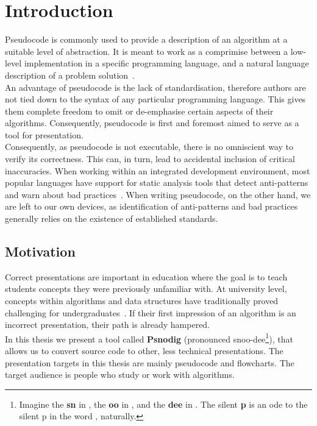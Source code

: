 \chapter{Introduction}

Pseudocode is commonly used to provide a description of an algorithm at a suitable level of abstraction. It is meant to work as a comprimise between a low-level implementation in a specific programming language, and a natural language description of a problem solution~\cite{whatIsPseudocode}. \\

An advantage of pseudocode is the lack of standardisation, therefore authors are not tied down to the syntax of any particular programming language. This gives them complete freedom to omit or de-emphasise certain aspects of their algorithms. Consequently, pseudocode is first and foremost aimed to serve as a tool for presentation. \\

Consequently, as pseudocode is not executable, there is no omniscient way to verify its correctness. This can, in turn, lead to accidental inclusion of critical inaccuracies. When working within an integrated development environment, most popular languages have support for static analysis tools that detect anti-patterns and warn about bad practices~\cite{manyLinters, whatIsALinter}. 
When writing pseudocode, on the other hand, we are left to our own devices, as identification of anti-patterns and bad practices generally relies on the existence of established standards. \\

\section{Motivation}

Correct presentations are important in education where the goal is to teach students concepts they were previously unfamiliar with. At university level, concepts within algorithms and data structures have traditionally proved challenging for undergraduates~\cite{algorithmsAreHard1, algorithmsAreHard2, algorithmsAreHard3}. If their first impression of an algorithm is an incorrect presentation, their path is already hampered. \\

In this thesis we present a tool called \textbf{Psnodig} (pronounced snoo-dee\footnote{Imagine the \textbf{sn} in , the \textbf{oo} in , and the \textbf{dee} in . The silent \textbf{p} is an ode to the silent p in the word , naturally.}), that allows us to convert source code to other, less technical presentations. The presentation targets in this thesis are mainly pseudocode and flowcharts. The target audience is people who study or work with algorithms. \\

